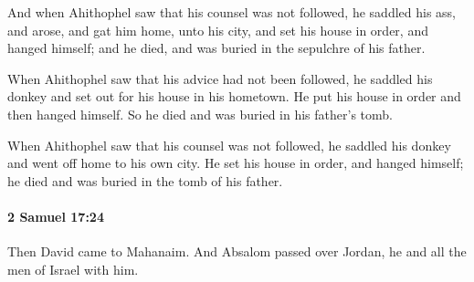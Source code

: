 			\begin{versebox}
					\item[BHS] 
					\item[ASV] And when Ahithophel saw that his counsel was not followed, he saddled his ass, and arose, and gat him home, unto his city, and set his house in order, and hanged himself; and he died, and was buried in the sepulchre of his father.
					\item[NIV] When Ahithophel saw that his advice had not been followed, he saddled his donkey and set out for his house in his hometown. He put his house in order and then hanged himself. So he died and was buried in his father’s tomb.
					\item[NRSV] When Ahithophel saw that his counsel was not followed, he saddled his donkey and went off home to his own city. He set his house in order, and hanged himself; he died and was buried in the tomb of his father.
			\end{versebox}

		\paragraph{2 Samuel 17:24} %
			\label{2SAMUEL-17-24}

			Then David came to Mahanaim. And Absalom passed over Jordan, he and all the men of Israel with him.


